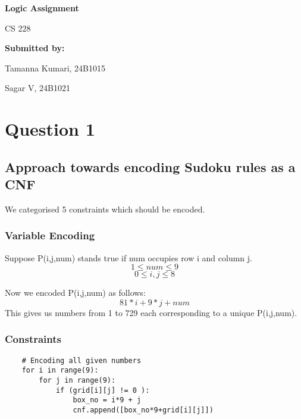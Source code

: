 \documentclass[12pt,a4paper]{article}
\begin{document}
\begin{titlepage}
    \centering
    \vspace*{2cm}
    
    {\LARGE \textbf{Logic Assignment} \par}
    \vspace{0.5cm}
    {\Large CS 228 \par}
    
    \vspace{4cm}
    
    \textbf{Submitted by:} \par
    Tamanna Kumari, 24B1015 \par
    Sagar V, 24B1021 \par
    
    \vfill
\end{titlepage}

\newpage
\section*{Question 1}

\subsection*{Approach towards encoding Sudoku rules as a CNF}
We categorised 5 constraints which should be encoded.

\subsubsection*{Variable Encoding}

Suppose P(i,j,num) stands true if num occupies row i and column j.
\[1\leq num\leq 9\]  
\[0\leq i,j\leq 8\]

Now we encoded P(i,j,num) as follows:
\[81*i + 9*j + num\]
This gives us numbers from 1 to 729 each corresponding to a unique P(i,j,num).

\subsubsection*{Constraints}
\begin{lstlisting}
    # Encoding all given numbers
    for i in range(9):
        for j in range(9):
            if (grid[i][j] != 0 ):
                box_no = i*9 + j
                cnf.append([box_no*9+grid[i][j]])
\end{lstlisting}
\end{document}

